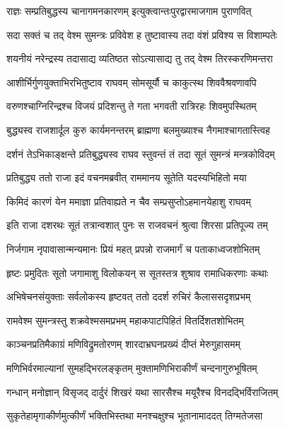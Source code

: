 \twolineshloka
{राज्ञः सम्प्रतिबुद्धस्य चानागमनकारणम्}
{इत्युक्त्वान्तःपुरद्वारमाजगाम पुराणवित्} %

\twolineshloka
{सदा सक्तं च तद् वेश्म सुमन्त्रः प्रविवेश ह}
{तुष्टावास्य तदा वंशं प्रविश्य स विशाम्पतेः} %

\twolineshloka
{शयनीयं नरेन्द्रस्य तदासाद्य व्यतिष्ठत}
{सोऽत्यासाद्य तु तद् वेश्म तिरस्करणिमन्तरा} %

\twolineshloka
{आशीर्भिर्गुणयुक्ताभिरभितुष्टाव राघवम्}
{सोमसूर्यौ च काकुत्स्थ शिववैश्रवणावपि} %

\twolineshloka
{वरुणश्चाग्निरिन्द्रश्च विजयं प्रदिशन्तु ते}
{गता भगवती रात्रिरहः शिवमुपस्थितम्} %

\twolineshloka
{बुद्ध्यस्व राजशार्दूल कुरु कार्यमनन्तरम्}
{ब्राह्मणा बलमुख्याश्च नैगमाश्चागतास्त्विह} %

\twolineshloka
{दर्शनं तेऽभिकाङ्क्षन्ते प्रतिबुद्ध्यस्व राघव}
{स्तुवन्तं तं तदा सूतं सुमन्त्रं मन्त्रकोविदम्} %

\twolineshloka
{प्रतिबुद्ध्य ततो राजा इदं वचनमब्रवीत्}
{राममानय सूतेति यदस्यभिहितो मया} %

\twolineshloka
{किमिदं कारणं येन ममाज्ञा प्रतिवाह्यते}
{न चैव सम्प्रसुप्तोऽहमानयेहाशु राघवम्} %

\twolineshloka
{इति राजा दशरथः सूतं तत्रान्वशात् पुनः}
{स राजवचनं श्रुत्वा शिरसा प्रतिपूज्य तम्} %

\twolineshloka
{निर्जगाम नृपावासान्मन्यमानः प्रियं महत्}
{प्रपन्नो राजमार्गं च पताकाध्वजशोभितम्} %

\twolineshloka
{हृष्टः प्रमुदितः सूतो जगामाशु विलोकयन्}
{स सूतस्तत्र शुश्राव रामाधिकरणाः कथाः} %

\twolineshloka
{अभिषेचनसंयुक्ताः सर्वलोकस्य हृष्टवत्}
{ततो ददर्श रुचिरं कैलाससदृशप्रभम्} %

\twolineshloka
{रामवेश्म सुमन्त्रस्तु शक्रवेश्मसमप्रभम्}
{महाकपाटपिहितं वितर्दिशतशोभितम्} %

\twolineshloka
{काञ्चनप्रतिमैकाग्रं मणिविद्रुमतोरणम्}
{शारदाभ्रघनप्रख्यं दीप्तं मेरुगुहासमम्} %

\twolineshloka
{मणिभिर्वरमाल्यानां सुमहद्भिरलङ्कृतम्}
{मुक्तामणिभिराकीर्णं चन्दनागुरुभूषितम्} %

\twolineshloka
{गन्धान् मनोज्ञान् विसृजद् दार्दुरं शिखरं यथा}
{सारसैश्च मयूरैश्च विनदद्भिर्विराजितम्} %

\twolineshloka
{सुकृतेहामृगाकीर्णमुत्कीर्णं भक्तिभिस्तथा}
{मनश्चक्षुश्च भूतानामाददत् तिग्मतेजसा} %


